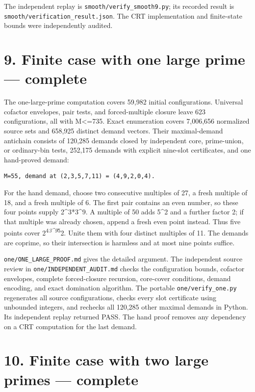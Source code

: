 \documentclass[11pt,a4paper]{article}
\begin{document}
The independent replay is \nolinkurl{smooth/verify_smooth9.py}; its
recorded result is \nolinkurl{smooth/verification_result.json}. The CRT
implementation and finite-state bounds were independently audited.

\section{9. Finite case with one large prime ---
complete}\label{finite-case-with-one-large-prime-complete}

The one-large-prime computation covers 59,982 initial configurations.
Universal cofactor envelopes, pair tests, and forced-multiple closure
leave 623 configurations, all with M\textless=735. Exact enumeration
covers 7,006,656 normalized source sets and 658,925 distinct demand
vectors. Their maximal-demand antichain consists of 120,285 demands
closed by independent core, prime-union, or ordinary-bin tests, 252,175
demands with explicit nine-slot certificates, and one hand-proved
demand:

\begin{verbatim}
M=55, demand at (2,3,5,7,11) = (4,9,2,0,4).
\end{verbatim}

For the hand demand, choose two consecutive multiples of 27, a fresh
multiple of 18, and a fresh multiple of 6. The first pair contains an
even number, so these four points supply 2\^{}3*3\^{}9. A multiple of 50
adds 5\^{}2 and a further factor 2; if that multiple was already chosen,
append a fresh even point instead. Thus five points cover
2\textsuperscript{4\emph{3\^{}9}5}2. Unite them with four distinct
multiples of 11. The demands are coprime, so their intersection is
harmless and at most nine points suffice.

\nolinkurl{one/ONE_LARGE_PROOF.md} gives the detailed argument. The
independent source review in \nolinkurl{one/INDEPENDENT_AUDIT.md} checks
the configuration bounds, cofactor envelopes, complete forced-closure
recursion, core-cover conditions, demand encoding, and exact domination
algorithm. The portable \nolinkurl{one/verify_one.py} regenerates all
source configurations, checks every slot certificate using unbounded
integers, and rechecks all 120,285 other maximal demands in Python. Its
independent replay returned PASS. The hand proof removes any dependency
on a CRT computation for the last demand.

\section{10. Finite case with two large primes ---
complete}\label{finite-case-with-two-large-primes-complete}
\end{document}
